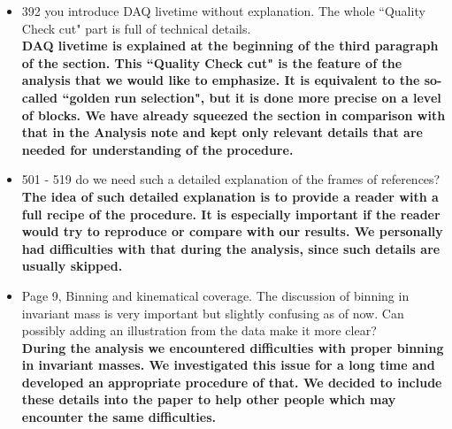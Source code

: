 \documentclass[,superscriptaddress,showpacs,amssymb,amsmath,amsfonts,linenumbers,article]{revtex4-1}
\begin{document}
\begin{itemize}
\item 392 you introduce DAQ livetime without explanation. The whole ``Quality Check cut" part is full of technical details.\\
{\bf DAQ livetime is explained at the beginning of the third paragraph of the section. This ``Quality Check cut" is the feature of the analysis that we would like to emphasize. It is equivalent to the so-called ``golden run selection", but it is done more precise on a level of blocks. We have already squeezed the section in comparison with that in the Analysis note and kept only relevant details that are needed for understanding of the procedure.}

\item 501 - 519 do we need such a detailed explanation of the frames of references?\\
{\bf The idea of such detailed explanation is to provide a reader with a full recipe of the procedure. It is especially important if the reader would try to reproduce or compare with our results. We personally had difficulties with that during the analysis, since such details are usually skipped.   
}

\item Page 9, Binning and kinematical coverage. The discussion of binning in invariant mass is very important but slightly confusing as of now. Can possibly adding an illustration from the data make it more clear?\\
{\bf During the analysis we encountered difficulties with proper binning in invariant masses. We investigated this issue for a long time and developed an appropriate procedure of that. We decided to include these details into the paper to help other people which may encounter the same difficulties.
}


\end{itemize}
\end{document}
